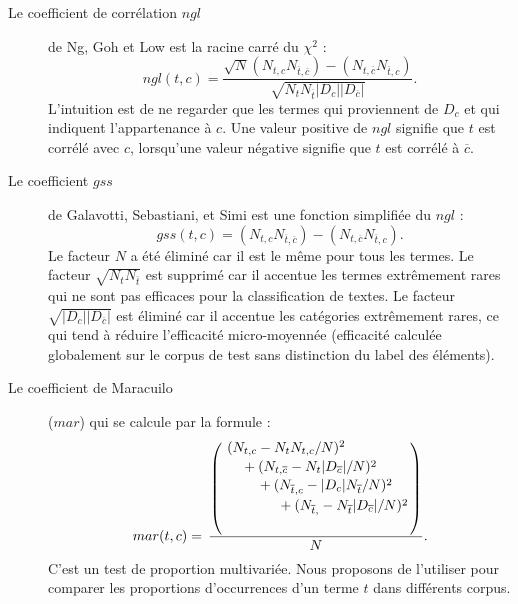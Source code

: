 \begin{description}
	\item[Le coefficient de corrélation $ngl$] de Ng, Goh et Low \citep{ng1997ngl} est la racine carré du $\chi^2$ \citep{schutze1995chi2} :
	\[ngl(t,c) = \frac{\sqrt{N} (N_{t,c} N_{\overline{t},\overline{c}}) - (N_{t,\overline{c}} N_{\overline{t},c})}{\sqrt{N_t N_{\overline{t}} \vert D_c \vert \vert D_{\overline{c}} \vert }}.\]
	L'intuition est de ne regarder que les termes qui proviennent de $D_c$ et qui indiquent l'appartenance à $c$. Une valeur positive de $ngl$ signifie que $t$ est corrélé avec $c$, lorsqu'une valeur négative signifie que $t$ est corrélé à $\overline{c}$.
	\item[Le coefficient $gss$] de Galavotti, Sebastiani, et Simi
	 \citep{galavotti2000gss} est une fonction simplifiée du $ngl$ \citep{ng1997ngl} :
	\[gss(t,c) = (N_{t,c} N_{\overline{t},\overline{c}}) - (N_{t,\overline{c}} N_{\overline{t},c}).\]
 Le facteur $N$ a été éliminé car il est le même pour tous les termes. Le facteur $\sqrt{N_tN_{\overline{t}}}$ est supprimé car il accentue les termes extrêmement rares qui ne sont pas efficaces pour la classification de textes. Le facteur $\sqrt{\vert D_c \vert \vert D_{\overline{c}} \vert}$ est éliminé car il accentue les catégories extrêmement rares, ce qui tend à réduire l'efficacité micro-moyennée (efficacité calculée globalement sur le corpus de test sans distinction du label des éléments).
 \item[Le coefficient de Maracuilo] ($mar$) \citep{marascuilo1966multcomparison} qui se calcule par la formule :
 \begin{equation*} mar(t, c) = 
 \,
 \dfrac{\left(
 	\splitdfrac{\splitdfrac{\splitdfrac{(N_{t,c} - N_{t}N_{t,c}/N)^2}{+ (N_{t,\overline{c}} - N_{t} \vert D_{\overline{c}} \vert /N)^2}}{+ (N_{\overline{t},c} - \vert D_c \vert N_{\overline{t}}/N)^2}}{+ (N_{\overline{t},\overline{}} - N_{\overline{t}} \vert D_{\overline{c}} \vert /N)^2}\right)}{N}.
 \end{equation*}
 C'est un test de proportion multivariée. Nous proposons de l'utiliser pour comparer les proportions d'occurrences d'un terme $t$ dans différents corpus. %

\end{description}
